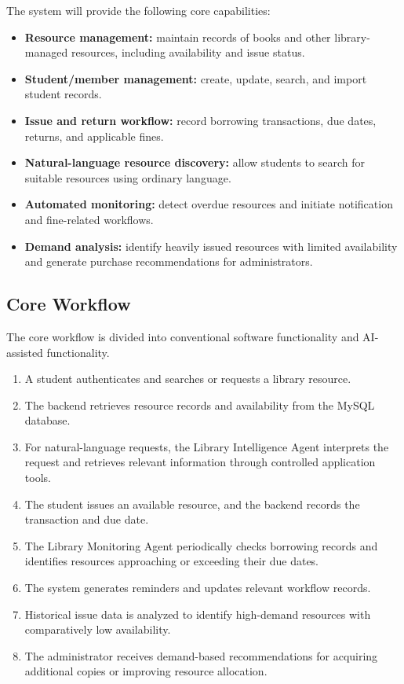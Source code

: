 \documentclass[11pt,a4paper]{article}
\begin{document}
The system will provide the following core capabilities:
\begin{itemize}
    \item \textbf{Resource management:} maintain records of books and other library-managed resources, including availability and issue status.
    \item \textbf{Student/member management:} create, update, search, and import student records.
    \item \textbf{Issue and return workflow:} record borrowing transactions, due dates, returns, and applicable fines.
    \item \textbf{Natural-language resource discovery:} allow students to search for suitable resources using ordinary language.
    \item \textbf{Automated monitoring:} detect overdue resources and initiate notification and fine-related workflows.
    \item \textbf{Demand analysis:} identify heavily issued resources with limited availability and generate purchase recommendations for administrators.
\end{itemize}

\subsection{Core Workflow}
The core workflow is divided into conventional software functionality and AI-assisted functionality.
\begin{enumerate}
    \item A student authenticates and searches or requests a library resource.
    \item The backend retrieves resource records and availability from the MySQL database.
    \item For natural-language requests, the Library Intelligence Agent interprets the request and retrieves relevant information through controlled application tools.
    \item The student issues an available resource, and the backend records the transaction and due date.
    \item The Library Monitoring Agent periodically checks borrowing records and identifies resources approaching or exceeding their due dates.
    \item The system generates reminders and updates relevant workflow records.
    \item Historical issue data is analyzed to identify high-demand resources with comparatively low availability.
    \item The administrator receives demand-based recommendations for acquiring additional copies or improving resource allocation.
\end{enumerate}
\end{document}
